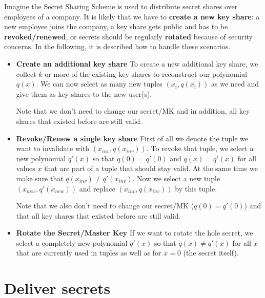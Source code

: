 \documentclass[runningheads]{llncs}
\begin{document}
\noindent
Imagine the Secret Sharing Scheme is used to distribute secret shares over employees of a company. It is likely that we have to \textbf{create a new key share}: a new employee joins the company, a key share gets public and has to be \textbf{revoked/renewed}, or secrets should be regularly \textbf{rotated} because of security concerns. In the following, it is described how to handle these scenarios.

\begin{itemize}
    \setlength\itemsep{1mm}
    \item \textbf{Create an additional key share} \newline
    To create a new additional key share, we collect $k$ or more of the existing key shares to reconstruct our polynomial $q(x)$. We can now select as many new tuples $(x_i,q(x_i))$ as we need and give them as key shares to the new user(s). 
    
    Note that we don't need to change our secret/MK and in addition, all key shares that existed before are still valid. 

    \item \textbf{Revoke/Renew a single key share} \newline
    First of all we denote the tuple we want to invalidate with $(x_{inv},q(x_{inv}))$.
    To revoke that tuple, we select a new polynomial $q'(x)$ so that $q(0) = q'(0)$ and $q(x) = q'(x)$ for all values $x$ that are part of a tuple that should stay valid. At the same time we make sure that $q(x_{inv}) \neq q'({x_{inv}})$. Now we select a new tuple $(x_{new},q'(x_{new}))$ and replace $(x_{inv},q(x_{inv}))$ by this tuple.
    
    Note that we also don't need to change our secret/MK ($q(0) = q'(0)$) and that all key shares that existed before are still valid. 
    
    \item \textbf{Rotate the Secret/Master Key} \newline
    If we want to rotate the hole secret, we select a completely new polynomial $q'(x)$ so that $q(x) \neq q'(x)$ for all $x$ that are currently used in tuples as well as for $x = 0$ (the secret itself). 
    
\end{itemize}

\section{Deliver secrets}
\end{document}

